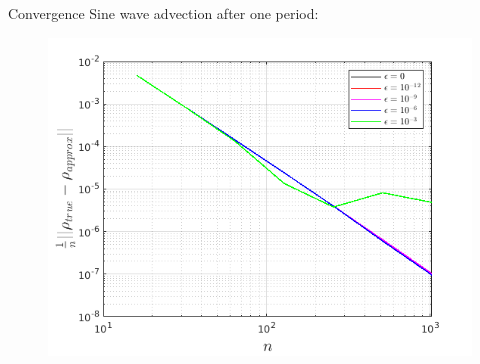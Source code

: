 \documentclass{beamer}
\begin{document}
\begin{frame}{Convergence}
  Sine wave advection after one period:
  \begin{figure}
    \center
    \includegraphics[scale=0.5]{convergence.png}
  \end{figure}
\end{frame}
\end{document}
